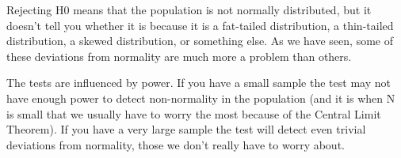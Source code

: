 Rejecting H0 means that the population is not normally distributed, but it doesn't tell you whether it is because it is a fat-tailed distribution, a thin-tailed distribution, a skewed distribution, or something else. As we have seen, some of these deviations from normality are much more a problem than others.
 
The tests are influenced by power. If you have a small sample the test may not have enough power to detect non-normality in the population (and it is when N is small that we usually have to worry the most because of the Central Limit Theorem). If you have a very large sample the test will detect even trivial deviations from normality, those we don't really have to worry about.
 


